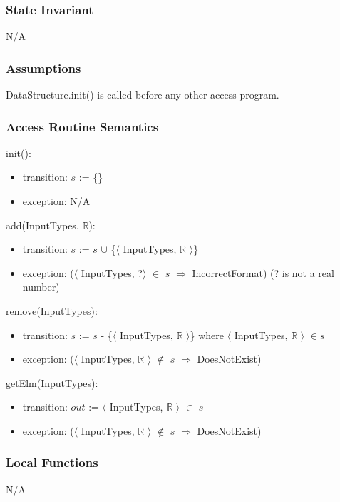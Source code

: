 \documentclass[12pt, titlepage]{article}
\begin{document}
\subsubsection{State Invariant}
N/A

\subsubsection{Assumptions}

DataStructure.init() is called before any other access program.

\subsubsection{Access Routine Semantics}

\noindent init():
\begin{itemize}
	\item transition: $s$ := \{\}
	\item exception: N/A
\end{itemize}

\noindent add(InputTypes, $\mathbb{R}$):
\begin{itemize}
	\item transition: $s$ := $s$ $\cup$ \{$\langle$ InputTypes, $\mathbb{R}$ $\rangle$\}
	\item exception: ($\langle$ InputTypes, ?$\rangle$ $\in$ $s$ $\Rightarrow$ IncorrectFormat) (? is not a real number)
\end{itemize}

\noindent remove(InputTypes):
\begin{itemize}
	\item transition: $s$ := $s$ - \{$\langle$ InputTypes, $\mathbb{R}$ $\rangle$\} where $\langle$ InputTypes, $\mathbb{R}$ $\rangle$ $\in $$s$
	\item exception: ($\langle$ InputTypes, $\mathbb{R}$ $\rangle$ $\notin$ $s$ $\Rightarrow$ DoesNotExist)
\end{itemize}

\noindent getElm(InputTypes):
\begin{itemize}
	\item transition: $out$ := $\langle$ InputTypes, $\mathbb{R}$ $\rangle$ $\in$ $s$
	\item exception: ($\langle$ InputTypes, $\mathbb{R}$ $\rangle$ $\notin$ $s$ $\Rightarrow$ DoesNotExist)
\end{itemize}

\subsubsection{Local Functions}
N/A
\end{document}
